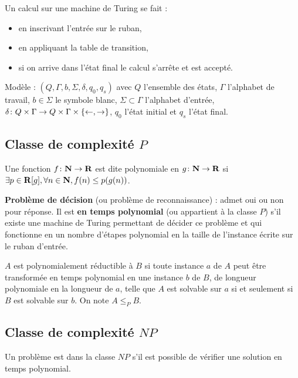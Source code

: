 \documentclass[a4paper,10pt,twocolumn]{article}
\begin{document}
	Un calcul sur une machine de Turing se fait :
	\begin{itemize}
	\item en inscrivant l'entrée sur le ruban,
	\item en appliquant la table de transition,
	\item si on arrive dans l'état final le calcul s'arrête et est accepté.
	\end{itemize}

	Modèle : $(Q,\Gamma,b,\Sigma,\delta,q_0,q_s)$ avec $Q$ l'ensemble des états, $\Gamma$ l'alphabet de travail, $b \in \Sigma$ le symbole blanc, $\Sigma \subset \Gamma$ l'alphabet d'entrée, $\delta \colon Q \times \Gamma \to Q \times \Gamma \times \{ \leftarrow, \rightarrow \}$, $q_0$ l'état initial et $q_s$ l'état final.

	\subsection{Classe de complexité $P$}

		\begin{defn}
		Une fonction $f \colon \mathbf{N} \to \mathbf{R}$ est dite polynomiale en $g \colon \mathbf{N} \to \mathbf{R}$ si $\exists p \in \mathbf{R}[g], \forall n \in \mathbf{N}, f(n) \leq p(g(n))$.
		\end{defn}

		\begin{defn}
		\textbf{Problème de décision} (ou problème de reconnaissance) : admet oui ou non pour réponse.
		Il est \textbf{en temps polynomial} (ou appartient à la classe $P$) s'il existe une machine de Turing permettant de décider ce problème et qui fonctionne en un nombre d'étapes polynomial en la taille de l'instance écrite sur le ruban d'entrée.
		\end{defn}

		\begin{note}
		$A$ est polynomialement réductible à $B$ si toute instance $a$ de $A$ peut être transformée en temps polynomial en une instance $b$ de $B$, de longueur polynomiale en la longueur de $a$, telle que $A$ est solvable sur $a$ si et seulement si $B$ est solvable sur $b$.
		On note $A \leq_P B$.
		\end{note}

	\subsection{Classe de complexité $NP$}

		\begin{defn}
		Un problème est dans la classe $NP$ s'il est possible de vérifier une solution en temps polynomial.
		\end{defn}
		
\end{document}
